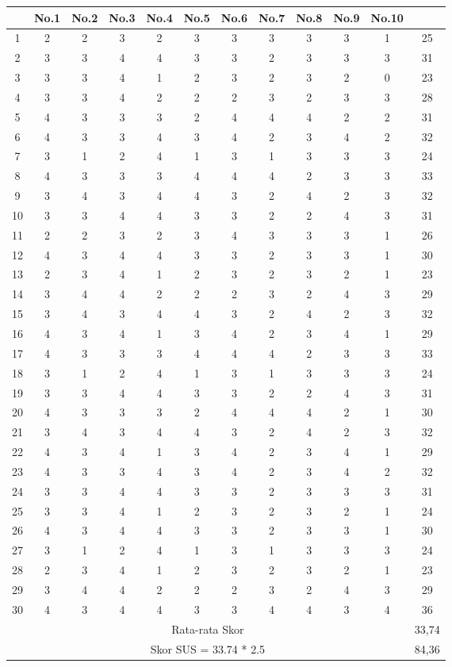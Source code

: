 \begin{landscape}
\begin{longtable}{|c|c|c|c|c|c|c|c|c|c|c|c|}
		\cline{2-11} & No.1 & No.2 & No.3 & No.4 & No.5 & No.6 & No.7 & No.8 & No.9 & No.10 &\\ \hline 
		1 & 2 & 2 & 3 & 2 & 3 & 3 & 3 & 3 & 3 & 1 & 25 \\ \hline
		2 & 3 & 3 & 4 & 4 & 3 & 3 & 2 & 3 & 3 & 3 &31 \\ \hline
		3 & 3 &3& 4& 1& 2& 3& 2& 3& 2& 0& 23 \\ \hline
		4 & 3 &3& 4& 2& 2& 2& 3& 2& 3& 3& 28 \\ \hline
		5 & 4 &3& 3& 3& 2& 4& 4& 4& 2& 2& 31 \\ \hline
		6 & 4 &3& 3& 4& 3& 4& 2& 3& 4& 2& 32 \\ \hline
		7 & 3 &1& 2& 4& 1& 3& 1& 3& 3& 3& 24 \\ \hline
		8 & 4 &3& 3& 3& 4& 4& 4& 2& 3& 3& 33 \\ \hline
		9 & 3 &4& 3& 4& 4& 3& 2& 4& 2& 3& 32 \\ \hline
		10& 3 &3& 4& 4& 3& 3& 2& 2& 4& 3& 31 \\ \hline
		11& 2 &2& 3& 2& 3& 4& 3& 3& 3& 1& 26 \\ \hline
		12& 4 &3& 4& 4& 3& 3& 2& 3& 3& 1& 30 \\ \hline
		13& 2 &3& 4& 1& 2& 3& 2& 3& 2& 1& 23 \\ \hline
		14& 3 &4& 4& 2& 2& 2& 3& 2& 4& 3& 29 \\ \hline
		15& 3 &4& 3& 4& 4& 3& 2& 4& 2& 3& 32 \\ \hline
		16& 4 &3& 4& 1& 3& 4& 2& 3& 4& 1& 29 \\ \hline
		17& 4 &3& 3& 3& 4& 4& 4& 2& 3& 3& 33 \\ \hline
		18& 3 &1& 2& 4& 1& 3& 1& 3& 3& 3& 24 \\ \hline
		19& 3 &3& 4& 4& 3& 3& 2& 2& 4& 3& 31 \\ \hline
		20& 4 &3& 3& 3& 2& 4& 4& 4& 2& 1& 30 \\ \hline
		21& 3 &4& 3& 4& 4& 3& 2& 4& 2& 3& 32 \\ \hline
		22& 4 &3& 4& 1& 3& 4& 2& 3& 4& 1& 29 \\ \hline
		23& 4 &3& 3& 4& 3& 4& 2& 3& 4& 2& 32 \\ \hline
		24& 3 &3& 4& 4& 3& 3& 2& 3& 3& 3& 31 \\ \hline
		25& 3 &3& 4& 1& 2& 3& 2& 3& 2& 1& 24 \\ \hline
		26& 4 &3& 4& 4& 3& 3& 2& 3& 3& 1& 30 \\ \hline
		27& 3 &1& 2& 4& 1& 3& 1& 3& 3& 3& 24 \\ \hline
		28& 2 &3& 4& 1& 2& 3& 2& 3& 2& 1& 23 \\ \hline
		29& 3 &4& 4& 2& 2& 2& 3& 2& 4& 3& 29 \\ \hline
		30& 4 &3& 4& 4& 3& 3& 4& 4& 3& 4& 36 \\ \hline
		
		
		
		
		\hline \multicolumn{11}{|c|}{Rata-rata Skor}  & 33,74\\
		\hline \multicolumn{11}{|c|}{Skor SUS = 33.74 * 2.5}  & 84,36\\
		\hline
	\end{longtable}
\end{landscape}


